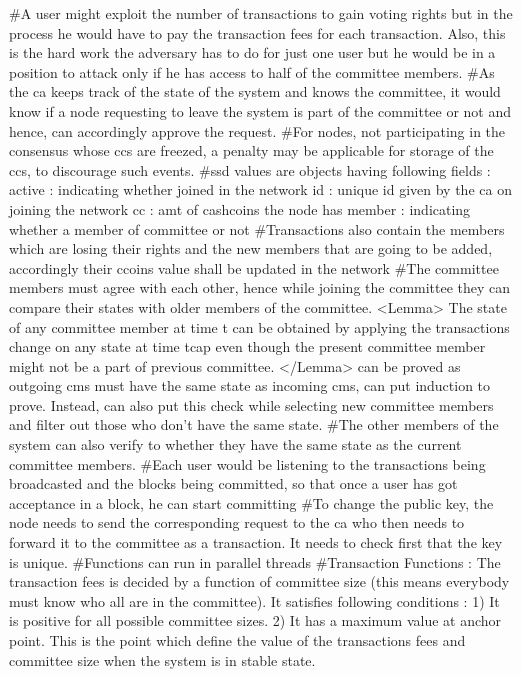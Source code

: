 #A user might exploit the number of transactions to gain voting rights but in the process he would have to pay the transaction fees for each transaction. Also, this is the hard work the adversary has to do for just one user but he would be in a position to attack only if he has access to half of the committee members.
#As the ca keeps track of the state of the system and knows the committee, it would know if a node requesting to leave the system is part of the committee or not and hence, can accordingly approve the request.
#For nodes, not participating in the consensus whose ccs are freezed, a penalty may be applicable for storage of the ccs, to discourage such events.
#ssd values are objects having following fields :
    active : indicating whether joined in the network
    id : unique id given by the ca on joining the network
    cc : amt of cashcoins the node has
    member : indicating whether a member of committee or not
#Transactions also contain the members which are losing their rights and the new members that are going to be added, accordingly their ccoins value shall be updated in the network
#The committee members must agree with each other, hence while joining the committee they can compare their states with older members of the committee. <Lemma> The state of any committee member at time t can be obtained by applying the transactions change on any state at time tcap even though the present committee member might not be a part of previous committee. </Lemma> can be proved as outgoing cms must have the same state as incoming cms, can put induction to prove. Instead, can also put this check while selecting new committee members and filter out those who don't have the same state.
#The other members of the system can also verify to whether they have the same state as the current committee members.
#Each user would be listening to the transactions being broadcasted and the blocks being committed, so that once a user has got acceptance in a block, he can start committing
#To change the public key, the node needs to send the corresponding request to the ca who then needs to forward it to the committee as a transaction. It needs to check first that the key is unique.
#Functions can run in parallel threads
#Transaction Functions :
    The transaction fees is decided by a function of committee size (this means everybody must know who all are in the committee). It satisfies following conditions :
    1) It is positive for all possible committee sizes.
    2) It has a maximum value at anchor point. This is the point which define the value of the transactions fees and committee size when the system is in stable state.
